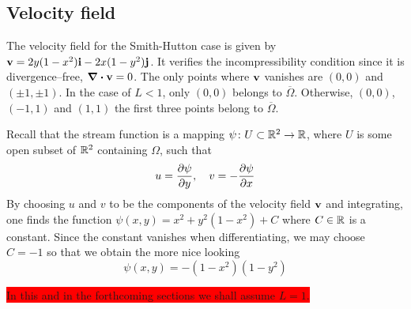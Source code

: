 
\subsection{Velocity field}

The velocity field for the Smith-Hutton case is given by $\vb{v} = 2 y (1 - x^2)
\vb{i} - 2 x (1 - y^2) \vb{j}$. It verifies the incompressibility condition
since it is divergence--free, \ie $\div{\vb{v}} = 0$. The only points where
$\vb{v}$ vanishes are $(0,0)$ and $(\pm 1, \pm 1)$. In the case of $L < 1$, only
$(0,0)$ belongs to $\overline{\Omega}$. Otherwise, $(0,0)$, $(-1,1)$ and $(1,1)$
the first three points belong to $\overline{\Omega}$. 

Recall that the
stream function is a mapping $\psi \colon U \subset \mathbb{R}^2 \to \mathbb{R}$, where
$U$ is some open subset of $\mathbb{R}^2$ containing $\Omega$, such that
\begin{equation} \label{eq:stream_function_definition}
	u = \pdv{\psi}{y}, \quad
	v = -\pdv{\psi}{x}
\end{equation}
By choosing $u$ and $v$ to be the components of the velocity field $\vb{v}$ and
integrating, one finds the function $\psi(x,y) = x^2 + y^2 (1 - x^2) + C$ where
$C \in \mathbb{R}$ is a constant. Since the constant vanishes when differentiating,
we may choose $C = -1$ so that we obtain the more nice looking
\begin{equation}
	\psi(x,y) = -(1 - x^2)(1 - y^2)
\end{equation}

\colorbox{red}{In this and in the forthcoming sections we shall assume $L = 1$. }

